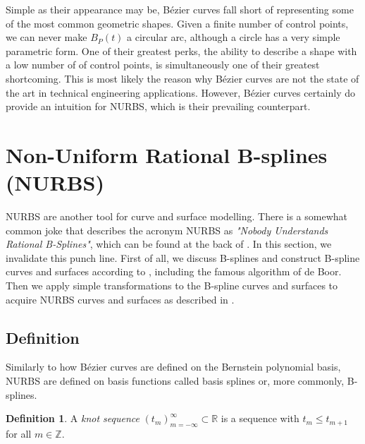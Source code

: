 \documentclass[a4paper, 11pt]{report}
\theoremstyle{definition}
\newtheorem{definition}{Definition}[section]
\renewcommand{\emph}[1]{\textit{#1}}
\begin{document}
	Simple as their appearance may be, Bézier curves fall short of representing some of the most common geometric shapes. Given a finite number of control points, we can never make $B_P(t)$ a circular arc, although a circle has a very simple parametric form. One of their greatest perks, the ability to describe a shape with a low number of of control points, is simultaneously one of their greatest shortcoming. This is most likely the reason why Bézier curves are not the state of the art in technical engineering applications. However, Bézier curves certainly do provide an intuition for NURBS, which is their prevailing counterpart.

\section{Non-Uniform Rational B-splines (NURBS)}
	NURBS are another tool for curve and surface modelling. There is a somewhat common joke that describes the acronym NURBS as \emph{"Nobody Understands Rational B-Splines"}, which can be found at the back of \cite{Piegl1997}. In this section, we invalidate this punch line. First of all, we discuss B-splines and construct B-spline curves and surfaces according to \cite{Farin2001}, including the famous algorithm of de Boor. Then we apply simple transformations to the B-spline curves and surfaces to acquire NURBS curves and surfaces as described in \cite{Piegl1997}.

\subsection{Definition}
	Similarly to how Bézier curves are defined on the Bernstein polynomial basis, NURBS are defined on basis functions called basis splines or, more commonly, B-splines.

	\begin{definition}
		A \emph{knot sequence} $(t_m)_{m=-\infty}^{\infty} \subset \mathbb{R}$ is a sequence with $t_{m} \leq t_{m+1}$ for all $m \in \mathbb{Z}$.
	\end{definition}
\end{document}
